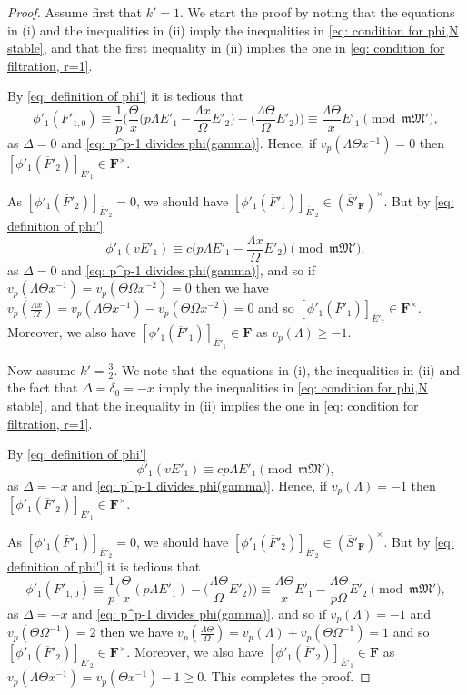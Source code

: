 \documentclass[11pt]{amsart}
\theoremstyle{definition}
\numberwithin{equation}{subsection}
\theoremstyle{plain}
\theoremstyle{plain}
\theoremstyle{plain}
\theoremstyle{plain}
\theoremstyle{plain}
\theoremstyle{plain}
\theoremstyle{plain}
\theoremstyle{plain}
\theoremstyle{plain}
\theoremstyle{plain}
\theoremstyle{plain}
\theoremstyle{plain}
\theoremstyle{definition}
\theoremstyle{definition}
\theoremstyle{definition}
\theoremstyle{remark}
\renewcommand{\(}{\textup{(}}
\renewcommand{\)}{\textup{)}}
\newcommand{\F}{\mathbf{F}}
\newcommand{\barS}{\overline{S}}
\newcommand{\fM}{\mathfrak{M}}
\newcommand{\fm}{\mathfrak{m}}
\newcommand{\barE}{\overline{E}}
\newcommand{\barF}{\overline{F}}
\begin{document}
\begin{proof}
Assume first that $k'=1$. We start the proof by noting that the equations in (i) and the inequalities in (ii) imply the inequalities in \eqref{eq: condition for phi,N stable}, and that the first inequality in (ii) implies the one in \eqref{eq: condition for filtration, r=1}.

By \eqref{eq: definition of phi'} it is tedious that
$$\phi'_1(F'_{1,0})\equiv \frac{1}{p}\bigg(\frac{\Theta}{x}\bigg(p\Lambda E'_1-\frac{\Lambda x}{\Omega}E'_2\bigg)-\bigg(\frac{\Lambda\Theta}{\Omega} E'_2\bigg)\bigg)\equiv \frac{\Lambda \Theta}{x} E'_1 \pmod{\fm\fM'},
$$
as $\Delta=0$ and \eqref{eq: p^p-1 divides phi(gamma)}. Hence, if $v_p(\Lambda\Theta x^{-1})=0$ then $[\phi'_1(\barF'_2)]_{\barE'_1}\in\F^{\times}$.

As $[\phi'_1(\barF'_2)]_{\barE'_2}=0$, we should have $[\phi'_1(\barF'_1)]_{\barE'_2}\in(\barS'_\F)^\times$. But by \eqref{eq: definition of phi'}
$$\phi'_1(vE'_1)\equiv c\bigg(p\Lambda E'_1-\frac{\Lambda x}{\Omega}E'_2\bigg)  \pmod{\fm\fM'},
$$
as $\Delta=0$ and \eqref{eq: p^p-1 divides phi(gamma)}, and so if $v_p(\Lambda\Theta x^{-1})=v_p(\Theta\Omega x^{-2})=0$ then we have 
$v_p(\frac{\Lambda x}{\Omega})=v_p(\Lambda\Theta x^{-1})-v_p(\Theta\Omega x^{-2})=0$ and so $[\phi'_1(\barF'_1)]_{\barE'_2}\in\F^{\times}$. Moreover, we also have $[\phi'_1(\barF'_1)]_{\barE'_1}\in\F$ as $v_p(\Lambda)\geq -1$.



Now assume $k'=\frac{3}{2}$. We note that the equations in (i), the inequalities in (ii) and the fact that $\Delta=\delta_0=-x$ imply the inequalities in \eqref{eq: condition for phi,N stable}, and that the inequality in (ii) implies the one in \eqref{eq: condition for filtration, r=1}.

By \eqref{eq: definition of phi'}
$$\phi'_1(vE'_1)\equiv cp\Lambda E'_1  \pmod{\fm\fM'},
$$
as $\Delta=-x$ and \eqref{eq: p^p-1 divides phi(gamma)}. Hence, if $v_p(\Lambda)=-1$ then $[\phi'_1(\barF'_2)]_{\barE'_1}\in\F^{\times}$.

As $[\phi'_1(\barF'_1)]_{\barE'_2}=0$, we should have $[\phi'_1(\barF'_2)]_{\barE'_2}\in(\barS'_\F)^\times$. But by \eqref{eq: definition of phi'} it is tedious that
$$\phi'_1(F'_{1,0})\equiv \frac{1}{p}\bigg(\frac{\Theta}{x}(p\Lambda E'_1)-\bigg(\frac{\Lambda\Theta}{\Omega} E'_2\bigg)\bigg)\equiv \frac{\Lambda \Theta}{x} E'_1-\frac{\Lambda\Theta}{p\Omega} E'_2 \pmod{\fm\fM'},
$$
as $\Delta=-x$ and \eqref{eq: p^p-1 divides phi(gamma)}, and so if $v_p(\Lambda)=-1$ and $v_p(\Theta\Omega^{-1})=2$ then we have $v_p(\frac{\Lambda\Theta}{\Omega})=v_p(\Lambda)+v_p(\Theta\Omega^{-1})=1$ and so $[\phi'_1(\barF'_2)]_{\barE'_2}\in\F^{\times}$. Moreover, we also have $[\phi'_1(\barF'_2)]_{\barE'_1}\in\F$ as $v_p(\Lambda \Theta x^{-1})=v_p(\Theta x^{-1})-1\geq 0$. This completes the proof.
\end{proof}
\end{document}
